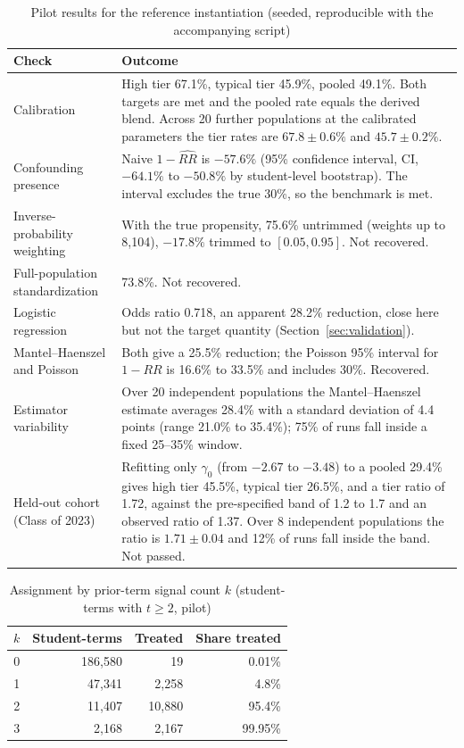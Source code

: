 \documentclass[11pt]{article}
\begin{document}
\begin{table}[ht]
\centering
\caption{Pilot results for the reference instantiation (seeded, reproducible with the accompanying script)}
\label{tab:pilot}
\small
\begin{tabular}{@{}p{}p{}@{}}
\toprule
\textbf{Check} & \textbf{Outcome} \\
\midrule
Calibration & High tier 67.1\%, typical tier 45.9\%, pooled 49.1\%. Both targets are met and the pooled rate equals the derived blend. Across 20 further populations at the calibrated parameters the tier rates are $67.8 \pm 0.6\%$ and $45.7 \pm 0.2\%$. \\
\addlinespace
Confounding presence & Naive $1-\widehat{RR}$ is $-57.6\%$ (95\% confidence interval, CI, $-64.1\%$ to $-50.8\%$ by student-level bootstrap). The interval excludes the true 30\%, so the benchmark is met. \\
\addlinespace
Inverse-probability weighting & With the true propensity, 75.6\% untrimmed (weights up to 8,104), $-17.8\%$ trimmed to $[0.05, 0.95]$. Not recovered. \\
\addlinespace
Full-population standardization & 73.8\%. Not recovered. \\
\addlinespace
Logistic regression & Odds ratio 0.718, an apparent 28.2\% reduction, close here but not the target quantity (Section~\ref{sec:validation}). \\
\addlinespace
Mantel--Haenszel and Poisson & Both give a 25.5\% reduction; the Poisson 95\% interval for $1-RR$ is 16.6\% to 33.5\% and includes 30\%. Recovered. \\
\addlinespace
Estimator variability & Over 20 independent populations the Mantel--Haenszel estimate averages 28.4\% with a standard deviation of 4.4 points (range 21.0\% to 35.4\%); 75\% of runs fall inside a fixed 25--35\% window. \\
\addlinespace
Held-out cohort (Class of 2023) & Refitting only $\gamma_0$ (from $-2.67$ to $-3.48$) to a pooled 29.4\% gives high tier 45.5\%, typical tier 26.5\%, and a tier ratio of 1.72, against the pre-specified band of 1.2 to 1.7 and an observed ratio of 1.37. Over 8 independent populations the ratio is $1.71 \pm 0.04$ and 12\% of runs fall inside the band. Not passed. \\
\bottomrule
\end{tabular}
\end{table}

\begin{table}[ht]
\centering
\caption{Assignment by prior-term signal count $k$ (student-terms with $t \ge 2$, pilot)}
\label{tab:positivity}
\small
\begin{tabular}{@{}rrrr@{}}
\toprule
$k$ & Student-terms & Treated & Share treated \\
\midrule
0 & 186,580 & 19 & 0.01\% \\
1 & 47,341 & 2,258 & 4.8\% \\
2 & 11,407 & 10,880 & 95.4\% \\
3 & 2,168 & 2,167 & 99.95\% \\
\bottomrule
\end{tabular}
\end{table}
\end{document}
